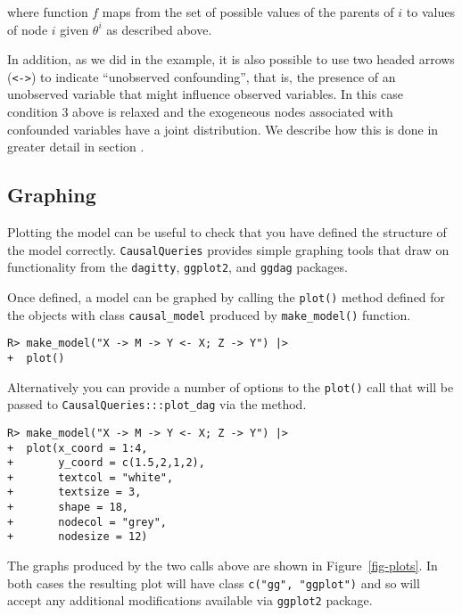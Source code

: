 \documentclass[
  11pt,
  article]{jss}
\begin{document}
where function \(f\) maps from the set of possible values of the parents
of \(i\) to values of node \(i\) given \(\theta^i\) as described above.

In addition, as we did in the \citet{chickering1996clinician} example,
it is also possible to use two headed arrows
(\texttt{\textless{}-\textgreater{}}) to indicate ``unobserved
confounding'', that is, the presence of an unobserved variable that
might influence observed variables. In this case condition 3 above is
relaxed and the exogeneous nodes associated with confounded variables
have a joint distribution. We describe how this is done in greater
detail in section \citet{confounding}.

\hypertarget{graphing}{%
\subsection{Graphing}\label{graphing}}

Plotting the model can be useful to check that you have defined the
structure of the model correctly. \texttt{CausalQueries} provides simple
graphing tools that draw on functionality from the \texttt{dagitty},
\texttt{ggplot2}, and \texttt{ggdag} packages.

Once defined, a model can be graphed by calling the \texttt{plot()}
method defined for the objects with class \texttt{causal\_model}
produced by \texttt{make\_model()} function.

\begin{verbatim}
R> make_model("X -> M -> Y <- X; Z -> Y") |>
+  plot()
\end{verbatim}

Alternatively you can provide a number of options to the \texttt{plot()}
call that will be passed to \texttt{CausalQueries:::plot\_dag} via the
method.

\begin{verbatim}
R> make_model("X -> M -> Y <- X; Z -> Y") |>
+  plot(x_coord = 1:4,
+       y_coord = c(1.5,2,1,2),
+       textcol = "white",
+       textsize = 3,
+       shape = 18,
+       nodecol = "grey",
+       nodesize = 12)
\end{verbatim}

The graphs produced by the two calls above are shown in
Figure~\ref{fig-plots}. In both cases the resulting plot will have class
\texttt{c("gg",\ "ggplot")} and so will accept any additional
modifications available via \texttt{ggplot2} package.
\end{document}
